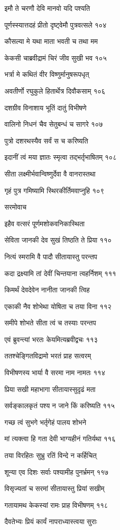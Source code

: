 इमौ ते चरणौ देवि मानवो यदि पश्यति

पूर्णस्स्यात्तदहं प्रीतो दृष्ट्वेमौ पुत्रवत्सले १०४

कौसल्या मे यथा माता भवती च तथा मम

केकसी चाब्रवीद्रामं चिरं जीव सुखी भव १०५

भर्त्रा मे कथितं वीर विष्णुर्मानुषरूपधृत्

अवतीर्णो रघुकुले हितार्थेत्र दिवौकसाम् १०६

दशग्रीव विनाशाय भूतिं दातुं विभीषणे

वालिनो निधनं चैव सेतुबन्धं च सागरे १०७

पुत्रो दशरथस्यैव सर्वं स च करिष्यति

इदानीं त्वं मया ज्ञातः स्मृत्वा तद्भर्तृभाषितम् १०८

सीता लक्ष्मीर्भवान्विष्णुर्देवा वै वानरास्तथा

गृहं पुत्र गमिष्यामि स्थिरकीर्तिमवाप्नुहि १०९

सरमोवाच

इहैव वत्सरं पूर्णमशोकवनिकास्थिता

सेविता जानकी देव सुखं तिष्ठति ते प्रिया ११०

नित्यं स्मरामि वै पादौ सीतायास्तु परन्तप

कदा द्रक्ष्यामि तां देवीं चिन्तयाना त्वहर्निशम् १११

किमर्थं देवदेवेन नानीता जानकी त्विह

एकाकी नैव शोभेथा योषिता च तया विना ११२

समीपे शोभते सीता त्वं च तस्याः परन्तप

एवं ब्रुवन्त्यां भरतः केयमित्यब्रवीद्वचः ११३

ततश्चेङ्गितविद्रामो भरतं प्राह सत्वरम्

विभीषणस्य भार्या वै सरमा नाम नामतः ११४

प्रिया सखी महाभागा सीतायास्सुदृढं मता

सर्वङ्कालकृतं पश्य न जाने किं करिष्यति ११५

गच्छ त्वं सुभगे भर्तृगेहं पालय शोभने

मां त्यक्त्वा हि गता देवी भाग्यहीनं गतिर्यथा ११६

तया विरहितः सुभ्रु रतिं विन्दे न कर्हिचित्

शून्या एव दिशः सर्वाः पश्यामीह पुनर्भ्रमन् ११७

विसृज्यतां च सरमां सीतायास्तु प्रियां सखीम्

गतायामथ केकस्यां रामः प्राह विभीषणम् ११८

दैवतेभ्यः प्रियं कार्यं नापराध्यास्त्वया सुराः

